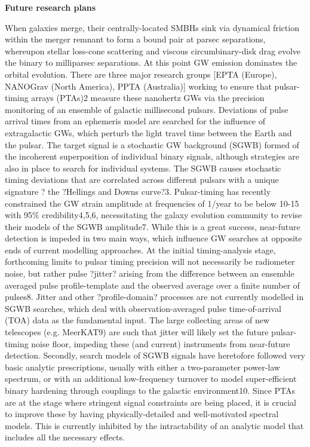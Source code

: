 \documentclass[11pt,letterpaper,sans]{moderncv} %
\begin{document}
\textbf{Future research plans}
\vspace{1.5mm}


When galaxies merge, their centrally-located SMBHs sink via dynamical friction within the merger remnant to form a bound pair at parsec separations, whereupon stellar loss-cone scattering and viscous circumbinary-disk drag evolve the binary to milliparsec separations. At this point GW emission dominates the orbital evolution. There are three major research groups [EPTA (Europe), NANOGrav (North America), PPTA (Australia)] working to ensure that pulsar-timing arrays (PTAs)2 measure these nanohertz GWs via the precision monitoring of an ensemble of galactic millisecond pulsars. Deviations of pulse arrival times from an ephemeris model are searched for the influence of extragalactic GWs, which perturb the light travel time between the Earth and the pulsar. The target signal is a stochastic GW background (SGWB) formed of the incoherent superposition of individual binary signals, although strategies are also in place to search for individual systems. The SGWB causes stochastic timing deviations that are correlated across different pulsars with a unique signature ? the ?Hellings and Downs curve?3.
	Pulsar-timing has recently constrained the GW strain amplitude at frequencies of 1/year to be below    10-15 with 95$\%$ credibility4,5,6, necessitating the galaxy evolution community to revise their models of the SGWB amplitude7. While this is a great success, near-future detection is impeded in two main ways, which influence GW searches at opposite ends of current modelling approaches. At the initial timing-analysis stage, forthcoming limits to pulsar timing precision will not necessarily be radiometer noise, but rather pulse ?jitter? arising from the difference between an ensemble averaged pulse profile-template and the observed average over a finite number of pulses8. Jitter and other ?profile-domain? processes are not currently modelled in SGWB searches, which deal with observation-averaged pulse time-of-arrival (TOA) data as the fundamental input. The large collecting areas of new telescopes (e.g. MeerKAT9) are such that jitter will likely set the future pulsar-timing noise floor, impeding these (and current) instruments from near-future detection. Secondly, search models of SGWB signals have heretofore followed very basic analytic prescriptions, usually with either a two-parameter power-law spectrum, or with an additional low-frequency turnover to model super-efficient binary hardening through couplings to the galactic environment10. Since PTAs are at the stage where stringent signal constraints are being placed, it is crucial to improve these by having physically-detailed and well-motivated spectral models. This is currently inhibited by the intractability of an analytic model that includes all the necessary effects.
\end{document}
